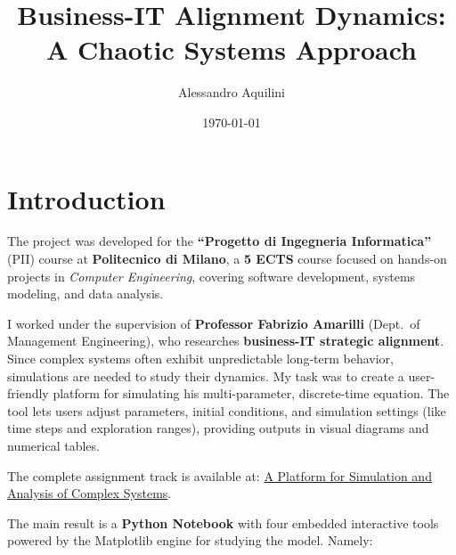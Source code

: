 \documentclass[a4paper, 10pt]{article}
\title{Business-IT Alignment Dynamics: A Chaotic Systems Approach}
\author{Alessandro Aquilini}
\date{\today}
\begin{document}
\raggedright     %

\maketitle


\tableofcontents

\clearpage

\section{Introduction}
The project was developed for the \textbf{``Progetto di Ingegneria Informatica''} (PII) course at \textbf{Politecnico di Milano}, a \textbf{5 ECTS} course focused on hands-on projects in \textit{Computer Engineering}, covering software development, systems modeling, and data analysis.

I worked under the supervision of \textbf{Professor Fabrizio Amarilli} (Dept.\ of Management Engineering), who researches \textbf{business-IT strategic alignment}. Since complex systems often exhibit unpredictable long-term behavior, simulations are needed to study their dynamics. \newline
My task was to create a user-friendly platform for simulating his multi-parameter, discrete-time equation. The tool lets users adjust parameters, initial conditions, and simulation settings (like time steps and exploration ranges), providing outputs in visual diagrams and numerical tables.

The complete assignment track is available at: 
\href{https://pii.deib.polimi.it/a-platform-for-simulation-and-analysis-of-complex-systems/}{A Platform for Simulation and Analysis of Complex Systems}.

The main result is a \textbf{Python Notebook} with four embedded interactive tools powered by the Matplotlib engine for studying the model. Namely:
\end{document}
